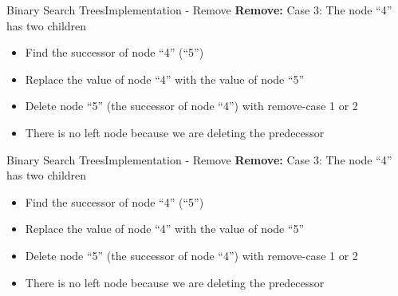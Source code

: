 
\begin{frame}{Binary Search Trees}{Implementation - Remove}
  \textbf{Remove:} Case 3: The node \enquote{4} has two children\\
  \begin{itemize}
    \item<2->
      Find the {\color{Mittel-Blau}successor} of node \enquote{4} (\enquote{5})
    \item<3->
      Replace the value of node \enquote{4} with the value of node \enquote{5}
    \item<4->
      Delete node \enquote{5} (the {\color{Mittel-Blau}successor} of node
      \enquote{4}) with remove-case 1 or 2
    \item<5->
      There is no left node because we are deleting the
      {\color{Mittel-Blau}predecessor}
  \end{itemize}
  \vspace{-1.5em}
  \begin{figure}
    
    \label{fig:binary_search_trees:binary_tree_remove_two_children}
  \end{figure}
\end{frame}


\begin{frame}{Binary Search Trees}{Implementation - Remove}
  \textbf{Remove:} Case 3: The node \enquote{4} has two children\\
  \begin{itemize}
    \item
      Find the {\color{Mittel-Blau}successor} of node \enquote{4} (\enquote{5})
    \item
      Replace the value of node \enquote{4} with the value of node \enquote{5}
    \item
      Delete node \enquote{5} (the {\color{Mittel-Blau}successor} of node
      \enquote{4}) with remove-case 1 or 2
    \item
      There is no left node because we are deleting the
      {\color{Mittel-Blau}predecessor}
  \end{itemize}
  \onslide
  \vspace{-1.5em}
  \begin{figure}
    
    \label{fig:binary_search_trees:binary_tree_remove_two_children_result}
  \end{figure}
\end{frame}

